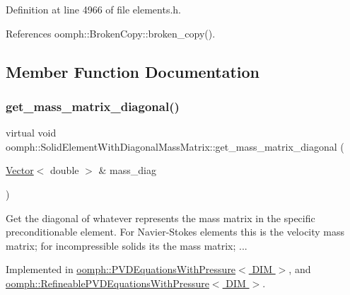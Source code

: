 Definition at line 4966 of file elements.\+h.



References oomph\+::\+Broken\+Copy\+::broken\+\_\+copy().



\subsection{Member Function Documentation}
\mbox{\label{classoomph_1_1SolidElementWithDiagonalMassMatrix_ad2335852a20987f6a6c8e0d6ce5bc3af}} 
\subsubsection{\texorpdfstring{get\+\_\+mass\+\_\+matrix\+\_\+diagonal()}{get\_mass\_matrix\_diagonal()}}
{\footnotesize\ttfamily virtual void oomph\+::\+Solid\+Element\+With\+Diagonal\+Mass\+Matrix\+::get\+\_\+mass\+\_\+matrix\+\_\+diagonal (\begin{DoxyParamCaption}\item[{\hyperlink{classoomph_1_1Vector}{Vector}$<$ double $>$ \&}]{mass\+\_\+diag }\end{DoxyParamCaption})\hspace{0.3cm}{\ttfamily [pure virtual]}}



Get the diagonal of whatever represents the mass matrix in the specific preconditionable element. For Navier-\/\+Stokes elements this is the velocity mass matrix; for incompressible solids it\textquotesingle{}s the mass matrix; ... 



Implemented in \hyperlink{classoomph_1_1PVDEquationsWithPressure_ad216a201134e2b239e3d5bcaedd56973}{oomph\+::\+P\+V\+D\+Equations\+With\+Pressure$<$ D\+I\+M $>$}, and \hyperlink{classoomph_1_1RefineablePVDEquationsWithPressure_ab15495baf81c012c6569f37b5c2b1e0f}{oomph\+::\+Refineable\+P\+V\+D\+Equations\+With\+Pressure$<$ D\+I\+M $>$}.



